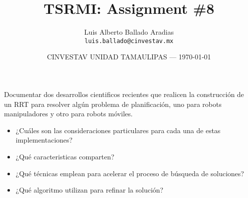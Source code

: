 \documentclass{article}
\title{TSRMI: Assignment \#8} %
\author{Luis Alberto Ballado Aradias\\ \texttt{luis.ballado@cinvestav.mx}} %
\date{CINVESTAV UNIDAD TAMAULIPAS --- \today} %
\begin{document}
\maketitle %


Documentar dos desarrollos cientificos recientes que realicen la construcción de un RRT para resolver algún problema de planificación, uno para robots manipuladores y otro para robots móviles.

\begin{itemize}

\item{¿Cuáles son las consideraciones particulares para cada una de estas implementaciones?} 


\item{¿Qué caracteristicas comparten?}

\item{¿Qué técnicas emplean para acelerar el proceso de búsqueda de soluciones?}

\item{¿Qué algoritmo utilizan para refinar la solución?}

\end{itemize}
  
\end{document}

